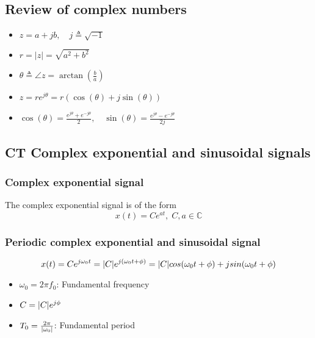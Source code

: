 \subsection{Review of complex numbers}
\begin{definition}
    \begin{itemize}
        \item $z = a + jb, \quad j \triangleq \sqrt{-1}$
        \item $r = |z| = \sqrt{a^2 + b^2}$
        \item $\theta \triangleq \angle z = \arctan\left(\frac{b}{a}\right)$
        \item $z = re^{j\theta} = r (\cos(\theta) + j \sin(\theta))$
        \item $\cos(\theta) = \frac{e^{j\theta} + e^{-j\theta}}{2}, \quad \sin(\theta) = \frac{e^{j\theta} - e^{-j\theta}}{2j}$
    \end{itemize}
\end{definition}

\subsection{CT Complex exponential and sinusoidal signals}
    \subsubsection{Complex exponential signal}
    \begin{definition} The complex exponential signal is of the form
        \begin{equation}
            x(t) = Ce^{at}, \; C,a\in \mathbb{C}
        \end{equation}
    \end{definition}

    \subsubsection{Periodic complex exponential and sinusoidal signal}
    \begin{definition}
        \begin{equation}
            x(t) = C e^{j \omega_0 t} = \abs{C} e^{j(\omega_0 t + \phi)} = \abs{C} cos(\omega_0 t + \phi) + j sin(\omega_0 t + \phi)
        \end{equation}
        \begin{itemize}
            \item $\omega_0 = 2\pi f_0$: Fundamental frequency
            \item $C = \abs{C} e^{j\phi}$
            \item $T_0 = \frac{2\pi}{\abs{\omega_0}}$: Fundamental period
        \end{itemize}
    \end{definition}

